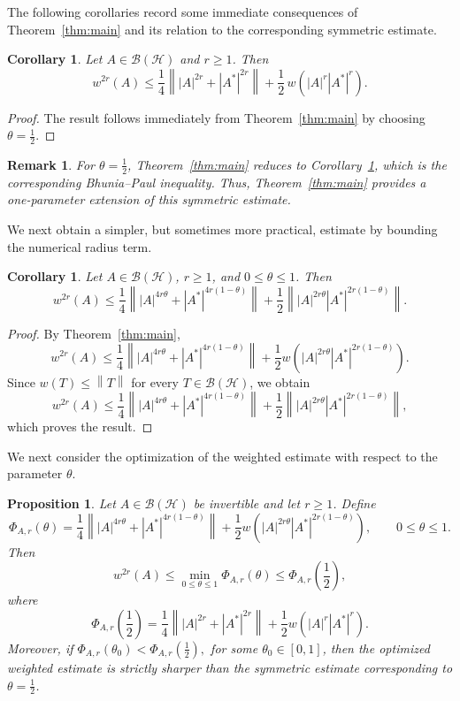 \documentclass[final,1p,times]{elsarticle}
\newtheorem{rem}[thm]{Remark}
\newtheorem{prop}[thm]{Proposition}
\newtheorem{cor}[thm]{Corollary}
\newcommand{\BH}{\mathcal{B}(\mathcal{H})}
\newcommand{\norm}[1]{\left\lVert #1 \right\rVert}
\begin{document}
The following corollaries record some immediate consequences of
Theorem~\ref{thm:main} and its relation to the corresponding symmetric estimate.

\begin{cor}\label{cor:theta-half}
Let $A\in\BH$ and $r\geq 1$. Then
\[
w^{2r}(A)
\leq
\frac14
\norm{|A|^{2r}+|A^*|^{2r}}
+
\frac12\,
w\!\left(|A|^r|A^*|^r\right).
\]
\end{cor}

\begin{proof}
The result follows immediately from Theorem~\ref{thm:main} by choosing $\theta=\tfrac12$.

\end{proof}

\begin{rem}
For $\theta=\frac12$, Theorem~\ref{thm:main} reduces to
Corollary~\ref{cor:theta-half}, which is the corresponding
Bhunia--Paul inequality. Thus, Theorem~\ref{thm:main} provides a
one-parameter extension of this symmetric estimate.
\end{rem}

\medskip

We next obtain a simpler, but sometimes more practical, estimate by bounding the
numerical radius term.

\begin{cor}\label{cor:norm-bound}
Let $A\in\BH$, $r\geq 1$, and $0\leq\theta\leq 1$. Then
\[
w^{2r}(A)
\leq
\frac14
\norm{
|A|^{4r\theta}
+
|A^*|^{4r(1-\theta)}
}
+
\frac12
\norm{
|A|^{2r\theta}
|A^*|^{2r(1-\theta)}
}.
\]
\end{cor}

\begin{proof}
By Theorem~\ref{thm:main},
\[
w^{2r}(A)
\leq
\frac14
\norm{
|A|^{4r\theta}
+
|A^*|^{4r(1-\theta)}
}
+
\frac12
w\!\left(
|A|^{2r\theta}
|A^*|^{2r(1-\theta)}
\right).
\]
Since $w(T)\leq\norm{T}$ for every $T\in\BH$, we obtain
\[
w^{2r}(A)
\leq
\frac14
\norm{
|A|^{4r\theta}
+
|A^*|^{4r(1-\theta)}
}
+
\frac12
\norm{
|A|^{2r\theta}
|A^*|^{2r(1-\theta)}
},
\]
which proves the result.
\end{proof}

\medskip

\noindent We next consider the optimization of the weighted estimate with respect to the parameter $\theta$.

\begin{prop}\label{prop:optimized-weight}
Let $A\in\BH$ be invertible and let $r\geq1$. Define
\[
\Phi_{A,r}(\theta)
=
\frac14
\norm{
|A|^{4r\theta}
+
|A^*|^{4r(1-\theta)}
}
+
\frac12
w\!\left(
|A|^{2r\theta}
|A^*|^{2r(1-\theta)}
\right),
\qquad 0\leq\theta\leq1.
\]
Then
\[
w^{2r}(A)
\leq
\min_{0\leq\theta\leq1}\Phi_{A,r}(\theta)
\leq
\Phi_{A,r}\!\left(\frac12\right),
\]
where
\[
\Phi_{A,r}\!\left(\frac12\right)
=
\frac14\norm{|A|^{2r}+|A^*|^{2r}}
+
\frac12 w\!\left(|A|^r|A^*|^r\right).
\]
Moreover, if $\Phi_{A,r}(\theta_0)
<
\Phi_{A,r}\!\left(\frac12\right),$
for some $\theta_0\in[0,1]$, then the optimized weighted estimate is
strictly sharper than the symmetric estimate corresponding to
$\theta=\frac12$.
\end{prop}
\end{document}

